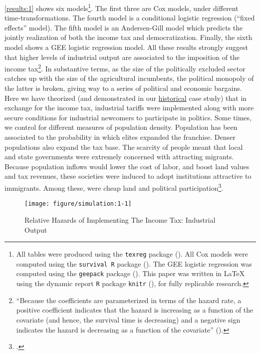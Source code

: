 \documentclass[onesided]{article}\usepackage[]{graphicx}\usepackage[]{color}
\makeatletter
\def\maxwidth{ %
  \ifdim\Gin@nat@width>\linewidth
    \linewidth
  \else
    \Gin@nat@width
  \fi
}
\newenvironment{knitrout}{}{} %
\makeatother
\begin{document}
\autoref{results:1} shows six models\footnote{All tables were produced using the  \texttt{texreg} package (\citet[]{Leifeld:2013qy}). All Cox models were computed using the \texttt{survival R}  package (\citet{Therneau:2015zr}). The  GEE logistic regression was computed using the \texttt{geepack} package (\citet[]{Hojsgaard:2016}). This paper was written in \LaTeX \; using the dynamic report \texttt{R} package \texttt{knitr} (\citet[]{Xie:2016hl}), for fully replicable research.}. The first three are Cox models, under different time-transformations. The fourth model is a conditional logistic regression (``fixed effects'' model). The fifth model is an Andersen-Gill model which predicts the jointly realization of both the income tax and democratization. Finally, the sixth model shows a GEE logistic regression model. All these results strongly suggest that higher levels of industrial output are associated to the imposition of the income tax\footnote{``Because the coefficients are parameterized in terms of the hazard rate, a positive coefficient indicates that the hazard is increasing as a function of the covariate (and hence, the survival time is decreasing) and a negative sign indicates the hazard is decreasing as a function of the covariate'' (\citet[p. 50]{Box-Steffensmeier2004}).}. In substantive terms, as the size of the politically excluded sector catches up with the size of the agricultural incumbents, the political monopoly of the latter is broken, giving way to a series of political and economic bargains. Here we have theorized (and demonstrated in our \hyperref[unpacking]{historical} case study) that in exchange for the income tax, industrial tariffs were implemented along with more secure conditions for industrial newcomers to participate in politics. Some times, we control for different measures of population density. Population has been associated to the probability in which elites expanded the franchise. Denser populations also expand the tax base. The scarcity of people meant that local and state governments were extremely concerned with attracting migrants. Because population inflows would lower the cost of labor, and boost land values and tax revenues, these societies were induced to adopt institutions attractive to immigrants. Among these, were cheap land and political participation\footnote{\citet[p. 892-893]{Engerman2005}.}.



\begin{knitrout}
\color{fgcolor}\begin{figure}[H]

{\centering \texttt{[image: figure/simulation:1-1]} 

}

\caption[Relative Hazards of Implementing The Income Tax]{Relative Hazards of Implementing The Income Tax: Industrial Output}\label{fig:simulation:1}
\end{figure}


\end{knitrout}
\end{document}
